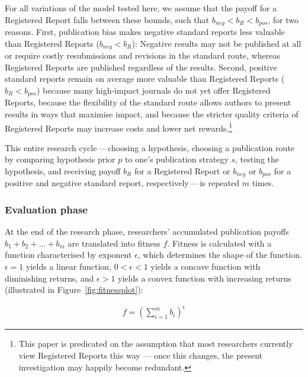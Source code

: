 \documentclass[
  british,
  a4paper,
  ,man,floatsintext]{apa6}
\begin{document}
For all variations of the model tested here, we assume that the payoff for a Registered Report falls between these bounds, such that \(b_{neg} < b_{R} < b_{pos}\), for two reasons.
First, publication bias makes negative standard reports less valuable than Registered Reports (\(b_{neg} < b_{R}\)): Negative results may not be published at all or require costly resubmissions and revisions in the standard route, whereas Registered Reports are published regardless of the results.
Second, positive standard reports remain on average more valuable than Registered Reports (\(b_{R} < b_{pos}\)) because many high-impact journals do not yet offer Registered Reports, because the flexibility of the standard route allows authors to present results in ways that maximise impact, and because the stricter quality criteria of Registered Reports may increase costs and lower net rewards.\footnote{This paper is predicated on the assumption that most researchers currently view Registered Reports this way --- once this changes, the present investigation may happily become redundant.}

This entire research cycle\(\,\)---\(\,\)choosing a hypothesis, choosing a publication route by comparing hypothesis prior \(p\) to one's publication strategy \(s\), testing the hypothesis, and receiving payoff \(b_{R}\) for a Registered Report or \(b_{neg}\) or \(b_{pos}\) for a positive and negative standard report, respectively\(\,\)---\(\,\)is repeated \(m\) times.

\subsubsection{Evaluation phase}\label{evaluation-phase}

At the end of the research phase, researchers' accumulated publication payoffs \(b_1 + b_2 + ... + b_m\) are translated into fitness \(f\).
Fitness is calculated with a function characterised by exponent \(\epsilon\), which determines the shape of the function. \(\epsilon = 1\) yields a linear function, \(0 < \epsilon < 1\) yields a concave function with diminishing returns, and \(\epsilon > 1\) yields a convex function with increasing returns (illustrated in Figure~\ref{fig:fitnessplot}):

\begin{align}
f = (\sum_{i=1}^{m} b_i)^\epsilon
\end{align}
\end{document}
